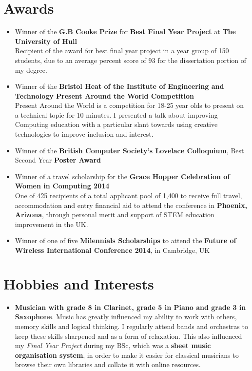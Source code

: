 \documentclass{article}
\begin{document}
\begin{flushleft}
\section*{Awards}
\begin{itemize}
\item Winner of the \textbf{G.B Cooke Prize} for \textbf{Best Final Year Project} at \textbf{The University of Hull}\\
\small Recipient of the award for best final year project in a year group of 150 students, due to an average percent score of 93 for the dissertation portion of my degree. 
\item Winner of the \textbf{Bristol Heat of the Institute of Engineering and Technology Present Around the World Competition} \\
\small Present Around the World is a competition for 18-25 year olds to present on a technical topic for 10 minutes. I presented a talk about improving Computing education with a particular slant towards using creative technologies to improve inclusion and interest.
\item \normalsize Winner of the \textbf{British Computer Society's Lovelace Colloquium}, Best Second Year \textbf{Poster Award}
\item Winner of a travel scholarship for the \textbf{Grace Hopper Celebration of Women in Computing 2014}\\
 \small One of 425 recipients of a total applicant pool of 1,400 to receive full travel,  accommodation and entry financial aid to attend the conference in \textbf{Phoenix, Arizona}, through personal merit and support of STEM education improvement in the UK.
\item \normalsize Winner of one of five \textbf{Milennials Scholarships} to attend the \textbf{Future of Wireless International Conference 2014}, in Cambridge, UK 
\end{itemize}


\section*{Hobbies and Interests}
\begin{itemize}
\item \textbf{Musician with grade 8 in Clarinet, grade 5 in Piano and grade 3 in Saxophone}. Music has greatly influenced my ability to work with others, memory skills and logical thinking. I regularly attend bands and orchestras to keep these skills sharpened and as a form of relaxation. This also influenced my \textit{Final Year Project} during my BSc, which was a \textbf{sheet music organisation system}, in order to make it easier for classical musicians to browse their own libraries and collate it with online resources. 


\end{itemize}
\end{flushleft}
\end{document}
